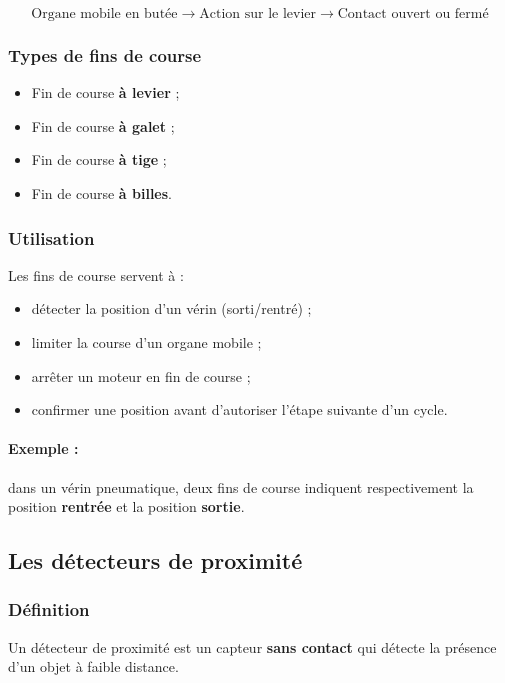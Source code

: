 \[
\text{Organe mobile en butée} \rightarrow \text{Action sur le levier} \rightarrow \text{Contact ouvert ou fermé}
\]

\subsubsection{Types de fins de course}

\begin{itemize}
    \item Fin de course \textbf{à levier} ;
    \item Fin de course \textbf{à galet} ;
    \item Fin de course \textbf{à tige} ;
    \item Fin de course \textbf{à billes}.
\end{itemize}

\subsubsection{Utilisation}

Les fins de course servent à :

\begin{itemize}
    \item détecter la position d'un vérin (sorti/rentré) ;
    \item limiter la course d'un organe mobile ;
    \item arrêter un moteur en fin de course ;
    \item confirmer une position avant d'autoriser l'étape suivante d'un cycle.
\end{itemize}

\paragraph{Exemple :} dans un vérin pneumatique, deux fins de course indiquent respectivement la position \textbf{rentrée} et la position \textbf{sortie}.

\subsection{Les détecteurs de proximité}

\subsubsection{Définition}

Un détecteur de proximité est un capteur \textbf{sans contact} qui détecte la présence d'un objet à faible distance.

